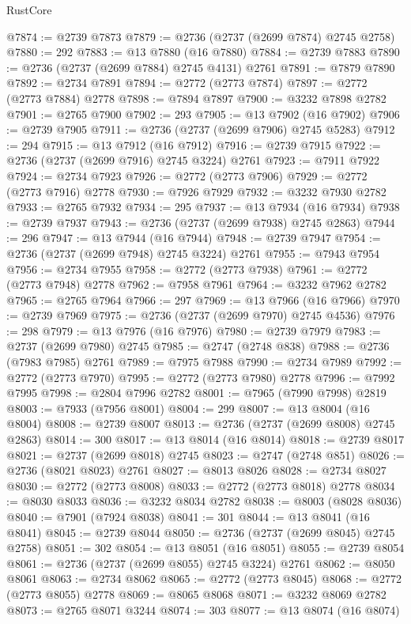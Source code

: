 \begin{lexlean}{RustCore}
\begin{coremodule}
@7874 := @2739 @7873
@7879 := @2736 (@2737 (@2699 @7874) @2745 @2758)
@7880 := 292
@7883 := @13 @7880 (@16 @7880)
@7884 := @2739 @7883
@7890 := @2736 (@2737 (@2699 @7884) @2745 @4131) @2761
@7891 := @7879 @7890
@7892 := @2734 @7891
@7894 := @2772 (@2773 @7874)
@7897 := @2772 (@2773 @7884) @2778
@7898 := @7894 @7897
@7900 := @3232 @7898 @2782
@7901 := @2765 @7900
@7902 := 293
@7905 := @13 @7902 (@16 @7902)
@7906 := @2739 @7905
@7911 := @2736 (@2737 (@2699 @7906) @2745 @5283)
@7912 := 294
@7915 := @13 @7912 (@16 @7912)
@7916 := @2739 @7915
@7922 := @2736 (@2737 (@2699 @7916) @2745 @3224) @2761
@7923 := @7911 @7922
@7924 := @2734 @7923
@7926 := @2772 (@2773 @7906)
@7929 := @2772 (@2773 @7916) @2778
@7930 := @7926 @7929
@7932 := @3232 @7930 @2782
@7933 := @2765 @7932
@7934 := 295
@7937 := @13 @7934 (@16 @7934)
@7938 := @2739 @7937
@7943 := @2736 (@2737 (@2699 @7938) @2745 @2863)
@7944 := 296
@7947 := @13 @7944 (@16 @7944)
@7948 := @2739 @7947
@7954 := @2736 (@2737 (@2699 @7948) @2745 @3224) @2761
@7955 := @7943 @7954
@7956 := @2734 @7955
@7958 := @2772 (@2773 @7938)
@7961 := @2772 (@2773 @7948) @2778
@7962 := @7958 @7961
@7964 := @3232 @7962 @2782
@7965 := @2765 @7964
@7966 := 297
@7969 := @13 @7966 (@16 @7966)
@7970 := @2739 @7969
@7975 := @2736 (@2737 (@2699 @7970) @2745 @4536)
@7976 := 298
@7979 := @13 @7976 (@16 @7976)
@7980 := @2739 @7979
@7983 := @2737 (@2699 @7980) @2745
@7985 := @2747 (@2748 @838)
@7988 := @2736 (@7983 @7985) @2761
@7989 := @7975 @7988
@7990 := @2734 @7989
@7992 := @2772 (@2773 @7970)
@7995 := @2772 (@2773 @7980) @2778
@7996 := @7992 @7995
@7998 := @2804 @7996 @2782
@8001 := @7965 (@7990 @7998) @2819
@8003 := @7933 (@7956 @8001)
@8004 := 299
@8007 := @13 @8004 (@16 @8004)
@8008 := @2739 @8007
@8013 := @2736 (@2737 (@2699 @8008) @2745 @2863)
@8014 := 300
@8017 := @13 @8014 (@16 @8014)
@8018 := @2739 @8017
@8021 := @2737 (@2699 @8018) @2745
@8023 := @2747 (@2748 @851)
@8026 := @2736 (@8021 @8023) @2761
@8027 := @8013 @8026
@8028 := @2734 @8027
@8030 := @2772 (@2773 @8008)
@8033 := @2772 (@2773 @8018) @2778
@8034 := @8030 @8033
@8036 := @3232 @8034 @2782
@8038 := @8003 (@8028 @8036)
@8040 := @7901 (@7924 @8038)
@8041 := 301
@8044 := @13 @8041 (@16 @8041)
@8045 := @2739 @8044
@8050 := @2736 (@2737 (@2699 @8045) @2745 @2758)
@8051 := 302
@8054 := @13 @8051 (@16 @8051)
@8055 := @2739 @8054
@8061 := @2736 (@2737 (@2699 @8055) @2745 @3224) @2761
@8062 := @8050 @8061
@8063 := @2734 @8062
@8065 := @2772 (@2773 @8045)
@8068 := @2772 (@2773 @8055) @2778
@8069 := @8065 @8068
@8071 := @3232 @8069 @2782
@8073 := @2765 @8071 @3244
@8074 := 303
@8077 := @13 @8074 (@16 @8074)

\end{coremodule}
\end{lexlean}
